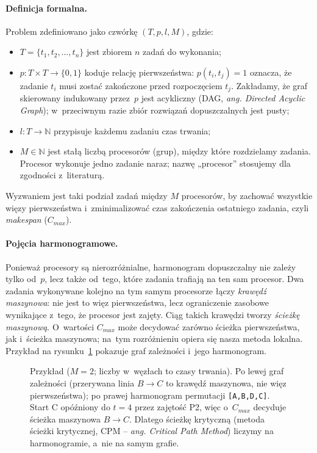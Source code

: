 \documentclass[pdflatex,sn-mathphys,Numbered]{sn-jnl}
\begin{document}
\paragraph{Definicja formalna.}
Problem zdefiniowano jako czwórkę $(T, p, l, M)$, gdzie:
\begin{itemize}[itemsep=3pt, topsep=3pt]
    \item $T = \{t_1, t_2, \dots, t_n\}$ jest zbiorem $n$ zadań do wykonania;
    \item $p : T \times T \to \{0, 1\}$ koduje relację pierwszeństwa: $p(t_i, t_j) = 1$ oznacza, że zadanie $t_i$ musi zostać zakończone przed rozpoczęciem $t_j$. Zakładamy, że graf skierowany indukowany przez~$p$ jest acykliczny (DAG, \textit{ang. Directed Acyclic Graph}); w~przeciwnym razie zbiór rozwiązań dopuszczalnych jest pusty;
    \item $l: T \to \mathbb{N}$ przypisuje każdemu zadaniu czas trwania;
    \item $M \in \mathbb{N}$ jest stałą liczbą procesorów (grup), między które rozdzielamy zadania. Procesor wykonuje jedno zadanie naraz; nazwę „procesor'' stosujemy dla zgodności z~literaturą.
\end{itemize}

\noindent
Wyzwaniem jest taki podział zadań między $M$ procesorów, by zachować wszystkie
więzy pierwszeństwa i~zminimalizować czas zakończenia ostatniego zadania, czyli
\textit{makespan} ($C_{max}$).

\paragraph{Pojęcia harmonogramowe.}
Ponieważ procesory są nierozróżnialne, harmonogram dopuszczalny nie zależy tylko
od~$p$, lecz także od~tego, które zadania trafiają na ten sam procesor. Dwa
zadania wykonywane kolejno na tym samym procesorze łączy \emph{krawędź maszynowa}:
nie jest to więz pierwszeństwa, lecz ograniczenie zasobowe wynikające z~tego,
że procesor jest zajęty. Ciąg takich krawędzi tworzy \emph{ścieżkę maszynową}.
O~wartości $C_{max}$ może decydować zarówno ścieżka pierwszeństwa, jak i~ścieżka
maszynowa; na~tym rozróżnieniu opiera się nasza metoda lokalna.
Przykład na rysunku~\ref{fig:przyklad} pokazuje graf zależności i~jego harmonogram.

\begin{figure}[H]
\centering

\caption{Przykład ($M=2$; liczby w~węzłach to czasy trwania). Po lewej graf
zależności (przerywana linia $B\!\to\!C$ to krawędź maszynowa, nie więz
pierwszeństwa); po prawej harmonogram permutacji \texttt{[A,B,D,C]}. Start C
opóźniony do $t=4$ przez zajętość P2, więc o~$C_{max}$ decyduje ścieżka maszynowa
$B\!\to\!C$. Dlatego ścieżkę krytyczną (metoda ścieżki krytycznej, CPM --
\textit{ang. Critical Path Method}) liczymy na harmonogramie, a~nie na samym grafie.}
\label{fig:przyklad}
\end{figure}
\end{document}
